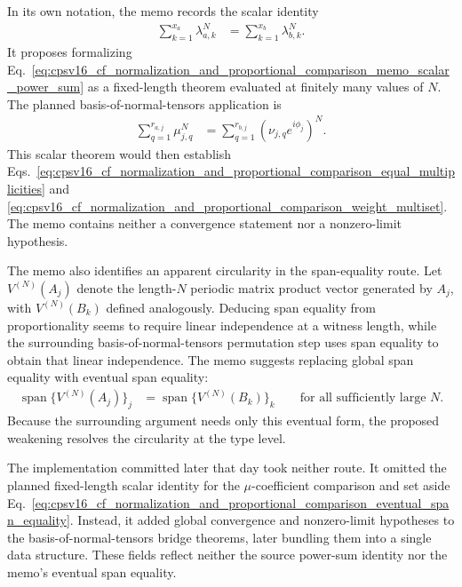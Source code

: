 \documentclass{article}
\begin{document}
In its own notation, the memo records the scalar identity
\begin{align}
    \sum_{k=1}^{x_a}\lambda_{a,k}^N
        &= \sum_{k=1}^{x_b}\lambda_{b,k}^N.
    \label{eq:cpsv16_cf_normalization_and_proportional_comparison_memo_scalar_power_sum}
\end{align}
It proposes formalizing
Eq.~\ref{eq:cpsv16_cf_normalization_and_proportional_comparison_memo_scalar_power_sum}
as a fixed-length theorem evaluated at finitely many values of $N$. The planned
basis-of-normal-tensors application is
\begin{align}
    \sum_{q=1}^{r_{a,j}}\mu_{j,q}^N
        &= \sum_{q=1}^{r_{b,j}}
            (\nu_{j,q}e^{i\phi_j})^N.
    \label{eq:cpsv16_cf_normalization_and_proportional_comparison_memo_bnt_power_sum}
\end{align}
This scalar theorem would then establish
Eqs.~\ref{eq:cpsv16_cf_normalization_and_proportional_comparison_equal_multiplicities}
and
\ref{eq:cpsv16_cf_normalization_and_proportional_comparison_weight_multiset}.
The memo contains neither a convergence statement nor a nonzero-limit
hypothesis.

The memo also identifies an apparent circularity in the span-equality route.
Let $V^{(N)}(A_j)$ denote the length-$N$ periodic matrix product vector
generated by $A_j$, with $V^{(N)}(B_k)$ defined analogously. Deducing span
equality from proportionality seems to require linear independence at a witness
length, while the surrounding basis-of-normal-tensors permutation step uses
span equality to obtain that linear independence. The memo suggests replacing
global span equality with eventual span equality:
\begin{align}
    \operatorname{span}\{V^{(N)}(A_j)\}_j
        &= \operatorname{span}\{V^{(N)}(B_k)\}_k
        \qquad\text{for all sufficiently large }N.
    \label{eq:cpsv16_cf_normalization_and_proportional_comparison_eventual_span_equality}
\end{align}
Because the surrounding argument needs only this eventual form, the proposed
weakening resolves the circularity at the type level.

The implementation committed later that day took neither route. It omitted the
planned fixed-length scalar identity for the $\mu$-coefficient comparison and
set aside
Eq.~\ref{eq:cpsv16_cf_normalization_and_proportional_comparison_eventual_span_equality}.
Instead, it added global convergence and nonzero-limit hypotheses to the
basis-of-normal-tensors bridge theorems, later bundling them into a single data
structure. These fields reflect neither the source power-sum identity nor the
memo's eventual span equality.
\end{document}
